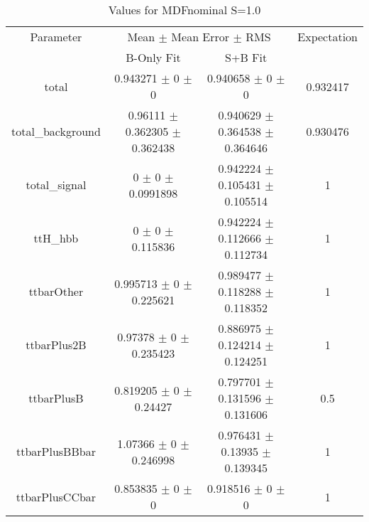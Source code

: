 \begin{table}
\centering
\caption{Values for MDFnominal S=1.0}
\begin{tabular}{cccc}
\toprule
Parameter & \multicolumn{2}{c}{Mean $\pm$ Mean Error $\pm$ RMS} & Expectation\\
 & B-Only Fit & S+B Fit & \\
\midrule
total & \num{0.943271} $\pm$ \num{0} $\pm$ \num{0} & \num{0.940658} $\pm$ \num{0} $\pm$ \num{0} & \num{0.932417}\\
total\_background & \num{0.96111} $\pm$ \num{0.362305} $\pm$ \num{0.362438} & \num{0.940629} $\pm$ \num{0.364538} $\pm$ \num{0.364646} & \num{0.930476}\\
total\_signal & \num{0} $\pm$ \num{0} $\pm$ \num{0.0991898} & \num{0.942224} $\pm$ \num{0.105431} $\pm$ \num{0.105514} & \num{1}\\
ttH\_hbb & \num{0} $\pm$ \num{0} $\pm$ \num{0.115836} & \num{0.942224} $\pm$ \num{0.112666} $\pm$ \num{0.112734} & \num{1}\\
ttbarOther & \num{0.995713} $\pm$ \num{0} $\pm$ \num{0.225621} & \num{0.989477} $\pm$ \num{0.118288} $\pm$ \num{0.118352} & \num{1}\\
ttbarPlus2B & \num{0.97378} $\pm$ \num{0} $\pm$ \num{0.235423} & \num{0.886975} $\pm$ \num{0.124214} $\pm$ \num{0.124251} & \num{1}\\
ttbarPlusB & \num{0.819205} $\pm$ \num{0} $\pm$ \num{0.24427} & \num{0.797701} $\pm$ \num{0.131596} $\pm$ \num{0.131606} & \num{0.5}\\
ttbarPlusBBbar & \num{1.07366} $\pm$ \num{0} $\pm$ \num{0.246998} & \num{0.976431} $\pm$ \num{0.13935} $\pm$ \num{0.139345} & \num{1}\\
ttbarPlusCCbar & \num{0.853835} $\pm$ \num{0} $\pm$ \num{0} & \num{0.918516} $\pm$ \num{0} $\pm$ \num{0} & \num{1}\\
\bottomrule
\end{tabular}
\end{table}